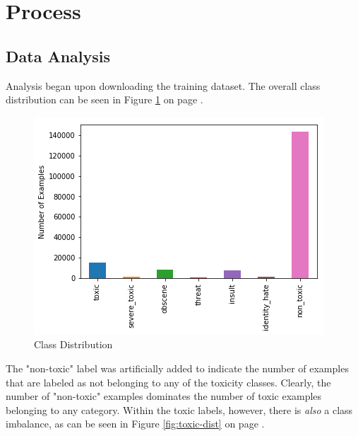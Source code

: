 \documentclass{article}
\begin{document}
\section{Process}{
  \subsection{Data Analysis}{
	  Analysis began upon downloading the training dataset. The overall class
	  distribution can be seen in Figure \ref{fig:class-dist} on page
	  \pageref{fig:class-dist}.
	  \begin{figure}[h]
		  \centering
		  \includegraphics[width=\textwidth]{class-distribution.png}
		  \caption{Class Distribution}
		  \label{fig:class-dist}
	  \end{figure}
	  The "non-toxic" label was artificially added to indicate the number of
	  examples that are labeled as not belonging to any of the toxicity classes.
	  Clearly, the number of "non-toxic" examples dominates the number of toxic
	  examples belonging to any category. Within the toxic labels, however, there
	  is \textit{also} a class imbalance, as can be seen in Figure
	  \ref{fig:toxic-dist} on page \pageref{fig:toxic-dist}.

}}
\end{document}
